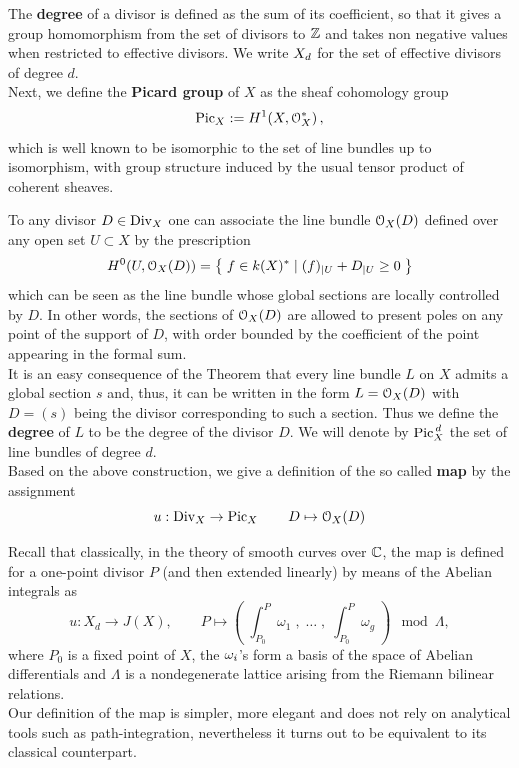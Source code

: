 	The \textbf{degree} of a divisor is defined as the sum of its coefficient, so that it gives a group homomorphism from the set of divisors to $\mathbb{Z}$ and takes non negative values when restricted to effective divisors. We write $X_d$ for the set of effective divisors of degree $d$.\\

	Next, we define the \textbf{Picard group} of $X$ as the sheaf cohomology group
	$$ \operatorname{Pic}_X := H^1(X, \mathcal{O}_X^*)\,, $$
	which is well known to be isomorphic to the set of line bundles up to isomorphism, with group structure induced by the usual tensor product of coherent sheaves. 

	To any divisor $D\in \operatorname{Div}_X$ one can associate the line bundle $\mathcal{O}_X(D)$ defined over any open set $U\subset X$ by the prescription
	$$ H^0(U, \mathcal{O}_X(D)) = \left\{\; f \in k(X)^* \mid (f)_{\mid U} + D_{\mid U} \geq 0 \;\right\} $$
	which can be seen as the line bundle whose global sections are locally controlled by $D$. 
	In other words, the sections of $\mathcal{O}_X(D)$ are allowed to present poles on any point of the support of $D$, with order bounded by the coefficient of the point appearing in the formal sum. \\
	It is an easy consequence of the \RR Theorem that every line bundle $L$ on $X$ admits a global section $s$ and, thus, it can be written in the form $L=\mathcal{O}_X(D)$ with $D=(s)$ being the divisor corresponding to such a section. Thus we define the \textbf{degree} of $L$ to be the degree of the divisor $D$. We will denote by $\operatorname{Pic}^{\,d}_X$ the set of line bundles of degree $d$.
	\\
	Based on the above construction, we give a definition of the so called \textbf{\AJJ map} by the assignment
	$$ u: \operatorname{Div}_X\to\operatorname{Pic}_X \qquad D\mapsto \mathcal{O}_X(D) $$ 
	\begin{rema}
		Recall that classically, in the theory of smooth curves over $\mathbb{C}$, the \AJJ map is defined for a one-point divisor $P$ (and then extended linearly) by means of the Abelian integrals as
		$$ u:X_d \to J(X), \qquad P \mapsto \left(\; \int_{P_0}^{P} \omega_1 \;,\; \dots\;,\; \int_{P_0}^{P} \omega_g \;\right) \mod \Lambda, $$
		where $P_0$ is a fixed point of $X$, the $\omega_i$'s form a basis of the space of Abelian differentials and $\Lambda$ is a nondegenerate lattice arising from the Riemann bilinear relations.\\
		Our definition of the \AJJ map is simpler, more elegant and does not rely on analytical tools such as path-integration, nevertheless it turns out to be equivalent to its classical counterpart.
	\end{rema}


